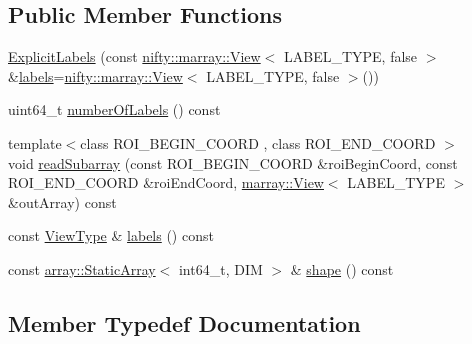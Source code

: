 \subsection*{Public Member Functions}
\begin{DoxyCompactItemize}
\item 
\hyperlink{classnifty_1_1graph_1_1ExplicitLabels_ae503c70604d75e48d73622f8941cfa34}{Explicit\+Labels} (const \hyperlink{classandres_1_1View}{nifty\+::marray\+::\+View}$<$ L\+A\+B\+E\+L\+\_\+\+T\+Y\+P\+E, false $>$ \&\hyperlink{classnifty_1_1graph_1_1ExplicitLabels_a791af26bb936452324bf9e0b35521382}{labels}=\hyperlink{classandres_1_1View}{nifty\+::marray\+::\+View}$<$ L\+A\+B\+E\+L\+\_\+\+T\+Y\+P\+E, false $>$())
\item 
uint64\+\_\+t \hyperlink{classnifty_1_1graph_1_1ExplicitLabels_ac60baa565d760fbd0685b51440f0cae0}{number\+Of\+Labels} () const 
\item 
{\footnotesize template$<$class R\+O\+I\+\_\+\+B\+E\+G\+I\+N\+\_\+\+C\+O\+O\+R\+D , class R\+O\+I\+\_\+\+E\+N\+D\+\_\+\+C\+O\+O\+R\+D $>$ }\\void \hyperlink{classnifty_1_1graph_1_1ExplicitLabels_a546bc09065e24792dce4ae415dc04727}{read\+Subarray} (const R\+O\+I\+\_\+\+B\+E\+G\+I\+N\+\_\+\+C\+O\+O\+R\+D \&roi\+Begin\+Coord, const R\+O\+I\+\_\+\+E\+N\+D\+\_\+\+C\+O\+O\+R\+D \&roi\+End\+Coord, \hyperlink{classandres_1_1View}{marray\+::\+View}$<$ L\+A\+B\+E\+L\+\_\+\+T\+Y\+P\+E $>$ \&out\+Array) const 
\item 
const \hyperlink{classnifty_1_1graph_1_1ExplicitLabels_aaab98314403b95503bf0c32e65fd1884}{View\+Type} \& \hyperlink{classnifty_1_1graph_1_1ExplicitLabels_a791af26bb936452324bf9e0b35521382}{labels} () const 
\item 
const \hyperlink{namespacenifty_1_1array_a683f151f19c851754e0c6d55ed16a0c2}{array\+::\+Static\+Array}$<$ int64\+\_\+t, D\+I\+M $>$ \& \hyperlink{classnifty_1_1graph_1_1ExplicitLabels_a92c40e0451004610fa03feee065dd316}{shape} () const 
\end{DoxyCompactItemize}


\subsection{Member Typedef Documentation}
\hypertarget{classnifty_1_1graph_1_1ExplicitLabels_a896653b58048ec52d8e00800279d9b53}{}

